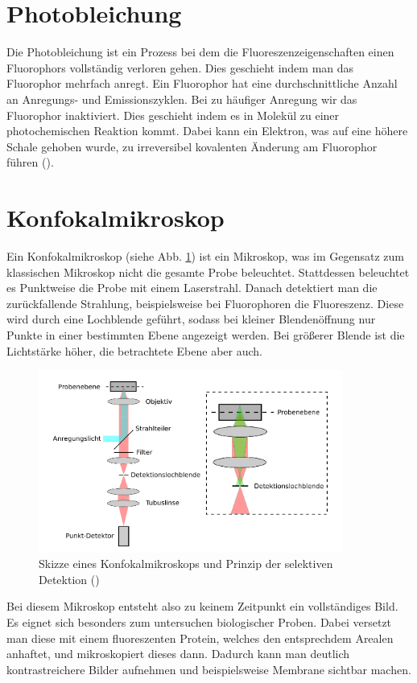 \section{Photobleichung}

Die Photobleichung ist ein Prozess bei dem die Fluoreszenzeigenschaften einen Fluorophors vollständig verloren gehen. 
Dies geschieht indem man das Fluorophor mehrfach anregt. Ein Fluorophor hat eine durchschnittliche Anzahl an Anregungs- und Emissionszyklen. 
Bei zu häufiger Anregung wir das Fluorophor inaktiviert. Dies geschieht indem es in Molekül zu einer photochemischen 
Reaktion kommt. Dabei kann ein Elektron, was auf eine höhere Schale gehoben wurde, zu irreversibel kovalenten Änderung am 
Fluorophor führen (\cite{Song1995}).

\section{Konfokalmikroskop}

Ein Konfokalmikroskop (siehe Abb. \ref{bild:Konfokalmikroskop}) ist ein Mikroskop, was im Gegensatz zum klassischen Mikroskop nicht die gesamte Probe beleuchtet. 
Stattdessen beleuchtet es Punktweise die Probe mit einem Laserstrahl. Danach detektiert man die zurückfallende Strahlung, 
beispielsweise bei Fluorophoren die Fluoreszenz. Diese wird durch eine Lochblende geführt, sodass bei kleiner 
Blendenöffnung nur Punkte in einer bestimmten Ebene angezeigt werden. Bei größerer Blende ist die Lichtstärke höher, die betrachtete Ebene aber auch. 

\begin{figure}[ht]
    \centering
    \includegraphics[width = 10cm]{Bilder/Grundlagen/Konfokalmikroskop.png}
    \caption{Skizze eines Konfokalmikroskops und Prinzip der selektiven Detektion (\cite{FRETSkript})}
    \label{bild:Konfokalmikroskop}
\end{figure}

Bei diesem Mikroskop entsteht also zu keinem Zeitpunkt ein vollständiges Bild. Es eignet sich besonders zum untersuchen biologischer Proben. 
Dabei versetzt man diese mit einem fluoreszenten Protein, welches den entsprechdem Arealen anhaftet, und mikroskopiert dieses dann. Dadurch kann man 
deutlich kontrastreichere Bilder aufnehmen und beispielsweise Membrane sichtbar machen. 